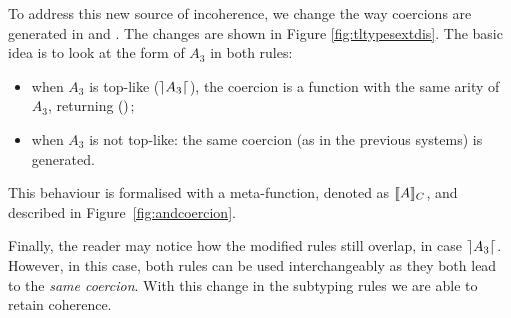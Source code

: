 To address this new source of incoherence, we change the way coercions
are generated in  and
. The changes are shown in Figure \ref{fig:tltypesextdis}.
The basic idea is to look at the form of $A_3$ in both rules:
\begin{itemize}
\item when $A_3$ is top-like ($\rceil A_3 \lceil$), the coercion is a function with the same arity of $A_3$, returning $()$;  
\item when $A_3$ is not top-like: the same coercion (as in the previous
  systems) is generated.
\end{itemize}
This behaviour is formalised with a meta-function, denoted as $\llbracket A \rrbracket_{C}$, and described in
Figure~\ref{fig:andcoercion}.

Finally, the reader may notice how the modified rules still overlap, in case $\rceil A_3 \lceil$. 
However, in this case, both rules can be used interchangeably as they both lead to the \emph{same coercion}.
With this change in the subtyping rules we are able to retain coherence.

